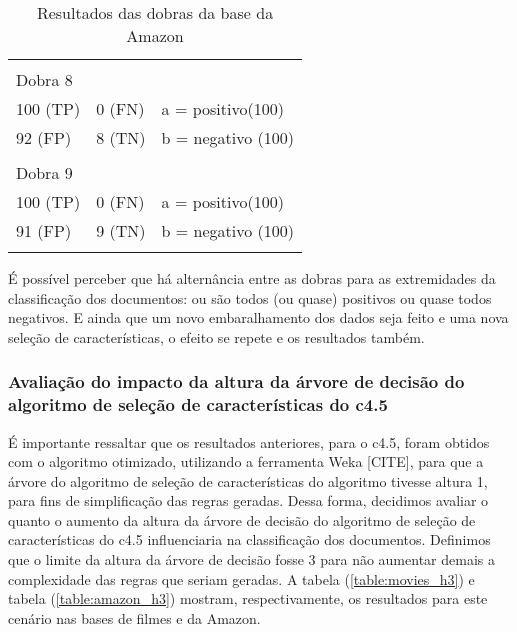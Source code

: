 \documentclass[template.tex]{subfiles}
\begin{document}
\begin{table}[!h]
\begin{tabular}{lll}
	&&\\
	Dobra 8    \\
    100 (TP)    				&0 (FN)      				& a = positivo(100) \\ 
    92 (FP)    				&8 (TN)      				& b = negativo (100) \\
	&&\\
	Dobra 9    \\
    100 (TP)    				&0 (FN)      				& a = positivo(100) \\ 
    91 (FP)    				&9 (TN)      				& b = negativo (100) \\
	&&\\
    \end{tabular}
    \caption{Resultados das dobras da base da Amazon}
	\label{table:amazon_folds}
\end{table}

É possível perceber que há alternância entre as dobras para as extremidades da classificação dos documentos: ou são todos (ou quase) positivos ou quase todos negativos. E ainda que um novo embaralhamento dos dados seja feito e uma nova seleção de características, o efeito se repete e os resultados também. 

\subsubsection{Avaliação do impacto da altura da árvore de decisão do algoritmo de seleção de características do c4.5}

É importante ressaltar que os resultados anteriores, para o c4.5, foram obtidos com o algoritmo otimizado, utilizando a ferramenta Weka [CITE], para que a árvore do algoritmo de seleção de características do algoritmo tivesse altura 1, para fins de simplificação das regras geradas. Dessa forma, decidimos avaliar o quanto o aumento da altura da árvore de decisão do algoritmo de seleção de características do c4.5 influenciaria na classificação dos documentos. Definimos que o limite da altura da árvore de decisão fosse 3 para não aumentar demais a complexidade das regras que seriam geradas. A tabela (\ref{table:movies_h3}) e tabela (\ref{table:amazon_h3}) mostram, respectivamente, os resultados para este cenário nas bases de filmes e da Amazon.
\end{document}
